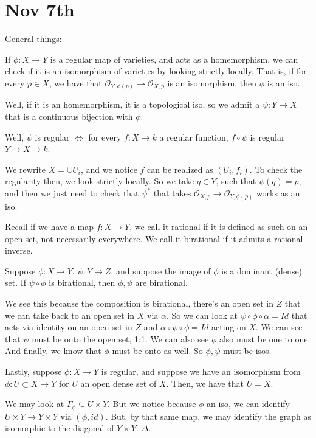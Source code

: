 \documentclass[10pt]{article}
\begin{document}
\section{Nov 7th}

General things:

If $\phi: X \to Y$ is a regular map of varieties, and acts as a homemorphism, we can check if it is an isomorphism of varieties by looking strictly locally. That is, if for every $p \in X$, we have that $\mathcal{O}_{Y, \phi(p)} \to \mathcal{O}_{X,p}$ is an isomorphism, then $\phi$ is an iso.

Well, if it is an homemorphism, it is a topological iso, so we admit a $\psi: Y \to X$ that is a continuous bijection with $\phi$.

Well, $\psi$ is regular $\iff$ for every $f: X \to k$ a regular function, $f \circ \psi$ is regular $Y \to X \to k$. 

We rewrite $X = \cup U_i$, and we notice $f$ can be realized as $(U_i, f_i)$. To check the regularity then, we look strictly locally. So we take $q \in Y$, such that $\psi(q) = p$, and then we just need to check that $\psi^*$ that takes $\mathcal{O}_{X,p} \to \mathcal{O}_{Y,\phi(p)}$ works as an iso.

Recall if we have a map $f: X \to Y$, we call it rational if it is defined as such on an open set, not necessarily everywhere. We call it birational if it admits a rational inverse.

Suppose $\phi: X \to Y$, $\psi: Y \to Z$, and suppose the image of $\phi$ is a dominant (dense) set. If $\psi \circ \phi$ is birational, then $\phi, \psi$ are birational. 

We see this because the composition is birational, there’s an open set in $Z$ that we can take back to an open set in $X$ via $\alpha$. So we can look at $\psi \circ \phi \circ \alpha = Id$ that acts via identity on an open set in $Z$ and $\alpha \circ \psi \circ \phi = Id$ acting on $X$. We can see that $\psi$ must be onto the open set, 1:1. We can also see $\phi$ also must be one to one. And finally, we know that $\phi$ must be onto as well. So $\phi, \psi$ must be isos.

Lastly, suppose $\overline{\phi}: X \to Y$ is regular, and suppose we have an isomorphism from $\phi: U \subset X \to Y$ for $U$ an open dense set of $X$. Then, we have that $U = X$.

We may look at $\Gamma_{\phi} \subseteq U \times Y$. But we notice because $\phi$ an iso, we can identify $U \times Y \to Y \times Y$ via $(\phi, id)$. But, by that same map, we may identify the graph as isomorphic to the diagonal of $Y \times Y$. $\Delta$. 
\end{document}

